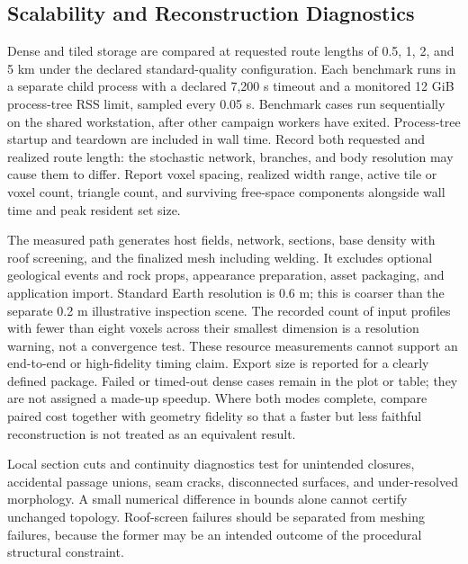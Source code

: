 \documentclass[conference]{IEEEtran}
\begin{document}
\subsection{Scalability and Reconstruction Diagnostics}
Dense and tiled storage are compared at requested route lengths of 0.5, 1, 2, and 5 km under the declared standard-quality configuration. Each benchmark runs in a separate child process with a declared 7,200 s timeout and a monitored 12 GiB process-tree RSS limit, sampled every 0.05 s. Benchmark cases run sequentially on the shared workstation, after other campaign workers have exited. Process-tree startup and teardown are included in wall time. Record both requested and realized route length: the stochastic network, branches, and body resolution may cause them to differ. Report voxel spacing, realized width range, active tile or voxel count, triangle count, and surviving free-space components alongside wall time and peak resident set size.

The measured path generates host fields, network, sections, base density with roof screening, and the finalized mesh including welding. It excludes optional geological events and rock props, appearance preparation, asset packaging, and application import. Standard Earth resolution is 0.6 m; this is coarser than the separate 0.2 m illustrative inspection scene. The recorded count of input profiles with fewer than eight voxels across their smallest dimension is a resolution warning, not a convergence test. These resource measurements cannot support an end-to-end or high-fidelity timing claim. Export size is reported for a clearly defined package. Failed or timed-out dense cases remain in the plot or table; they are not assigned a made-up speedup. Where both modes complete, compare paired cost together with geometry fidelity so that a faster but less faithful reconstruction is not treated as an equivalent result.

Local section cuts and continuity diagnostics test for unintended closures, accidental passage unions, seam cracks, disconnected surfaces, and under-resolved morphology. A small numerical difference in bounds alone cannot certify unchanged topology. Roof-screen failures should be separated from meshing failures, because the former may be an intended outcome of the procedural structural constraint.
\end{document}
